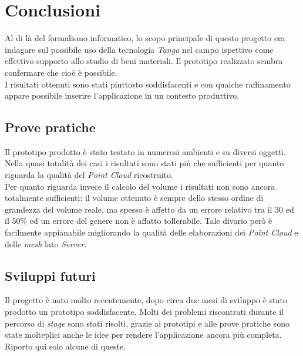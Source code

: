 
\chapter{Conclusioni}
\label{cap:conclusioni}
Al di là del formalismo informatico, lo scopo principale di questo progetto era indagare sul possibile uso della tecnologia \emph{Tango} nel campo ispettivo come effettivo supporto allo studio di beni materiali. Il prototipo realizzato sembra confermare che cioè è possibile.\\
I risultati ottenuti sono stati piuttosto soddisfacenti e con qualche raffinamento appare possibile inserire l'applicazione in un contesto produttivo.

\section{Prove pratiche}
Il prototipo prodotto è stato testato in numerosi ambienti e su diversi oggetti. Nella quasi totalità dei casi i risultati sono stati più che sufficienti per quanto riguarda la qualità del \emph{Point Cloud} ricostruito.\\
Per quanto riguarda invece il calcolo del volume i risultati non sono ancora totalmente sufficienti: il volume ottenuto è sempre dello stesso ordine di grandezza del volume reale, ma spesso è affetto da un errore relativo tra il 30 ed il 50\% ed un errore del genere non è affatto tollerabile. Tale divario però è facilmente appianabile migliorando la qualità delle elaborazioni dei \emph{Point Cloud} e delle \emph{mesh} lato \emph{Server}.

\section{Sviluppi futuri}
Il progetto è nato molto recentemente, dopo circa due mesi di sviluppo è stato prodotto un prototipo soddisfacente. Molti dei problemi riscontrati durante il percorso di \emph{stage} sono stati risolti, grazie ai prototipi e alle prove pratiche sono state molteplici anche le idee per rendere l'applicazione ancora più completa. Riporto qui solo alcune di queste.

